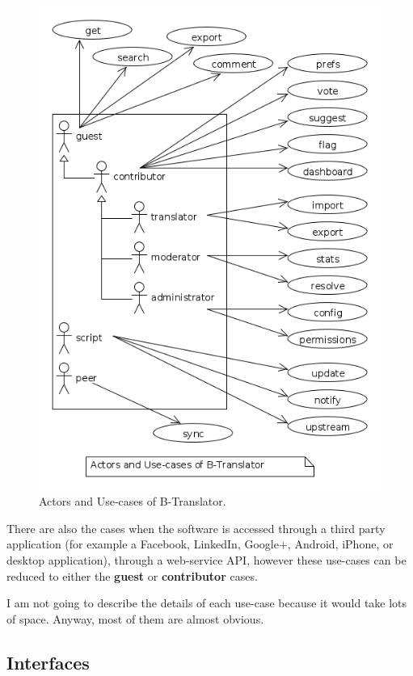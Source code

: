 \documentclass[11pt]{article}
\begin{document}
   \begin{figure}[htb]
\centering
\includegraphics[width=13cm]{./uml/functional_analysis.png}
\caption{\label{fig:functional_analysis}Actors and Use-cases of B-Translator.}
\end{figure}

   There are also the cases when the software is accessed through a
   third party application (for example a Facebook, LinkedIn, Google+,
   Android, iPhone, or desktop application), through a web-service
   API, however these use-cases can be reduced to either the \textbf{guest}
   or \textbf{contributor} cases.

   I am not going to describe the details of each use-case because it
   would take lots of space. Anyway, most of them are almost obvious.

\subsection{Interfaces}
\label{sec-4.2}
\end{document}
